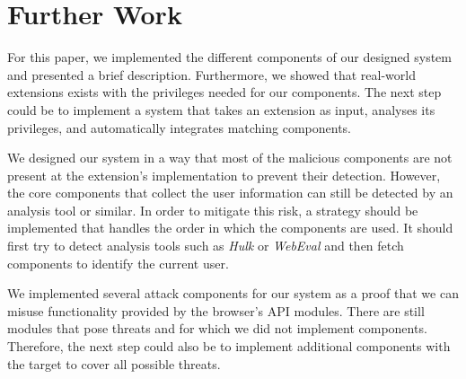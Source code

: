 
\chapter{Further Work}
\label{chp:furhterWork}

	For this paper, we implemented the different components of our designed system and presented a brief description. Furthermore, we showed that real-world extensions exists with the privileges needed for our components. The next step could be to implement a system that takes an extension as input, analyses its privileges, and automatically integrates matching components. 

	We designed our system in a way that most of the malicious components are not present at the extension's implementation to prevent their detection. However, the core components that collect the user information can still be detected by an analysis tool or similar. In order to mitigate this risk, a strategy should be implemented that handles the order in which the components are used. It should first try to detect analysis tools such as \textit{Hulk}\cite{184485} or \textit{WebEval}\cite{190984} and then fetch components to identify the current user.
	
	We implemented several attack components for our system as a proof that we can misuse functionality provided by the browser's API modules. There are still modules that pose threats and for which we did not implement components. Therefore, the next step could also be to implement additional components with the target to cover all possible threats. 